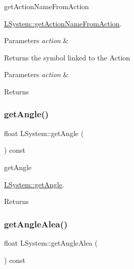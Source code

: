 get\+Action\+Name\+From\+Action 

\hyperlink{classLSystem_a9e7629465147d4959c15bf678bff1325}{L\+System\+::get\+Action\+Name\+From\+Action}.


\begin{DoxyParams}{Parameters}
{\em action} & \\
\hline
\end{DoxyParams}
\begin{DoxyReturn}{Returns}
the symbol linked to the Action
\end{DoxyReturn}

\begin{DoxyParams}{Parameters}
{\em action} & \\
\hline
\end{DoxyParams}
\begin{DoxyReturn}{Returns}

\end{DoxyReturn}
\mbox{\label{classLSystem_ad8747dbe41d79ae7ac257b78a967ebc0}} 
\subsubsection{\texorpdfstring{get\+Angle()}{getAngle()}}
{\footnotesize\ttfamily float L\+System\+::get\+Angle (\begin{DoxyParamCaption}{ }\end{DoxyParamCaption}) const}



get\+Angle 

\hyperlink{classLSystem_ad8747dbe41d79ae7ac257b78a967ebc0}{L\+System\+::get\+Angle}.

\begin{DoxyReturn}{Returns}

\end{DoxyReturn}
\mbox{\label{classLSystem_aa6cc5c18686831374eafcfda3c96d392}} 
\subsubsection{\texorpdfstring{get\+Angle\+Alea()}{getAngleAlea()}}
{\footnotesize\ttfamily float L\+System\+::get\+Angle\+Alea (\begin{DoxyParamCaption}{ }\end{DoxyParamCaption}) const}



